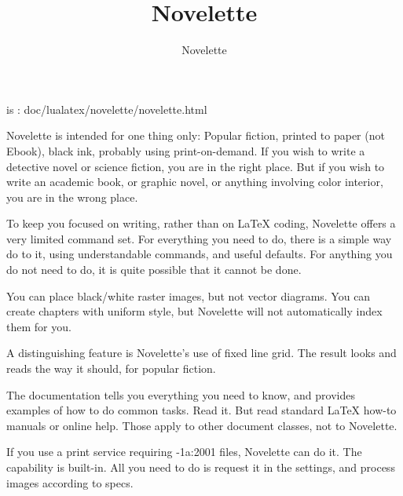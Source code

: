 \documentclass{novelette}
\title{Novelette}
\author{Novelette}
\begin{document}
\mainmatter
\begin{opening}
\null\null
{}
\null\null
\end{opening}
 is :
doc/lualatex/novelette/novelette.html\par
\scene{-}
Novelette is intended for one thing only: Popular fiction, printed to paper
(not Ebook), black ink, probably using print-on-demand. If you wish to write
a detective novel or science fiction, you are in the right place. But if
you wish to write an academic book, or graphic novel, or anything involving
color interior, you are in the wrong place.

To keep you focused on writing, rather than on LaTeX coding, Novelette offers
a very limited command set. For everything you need to do, there is a simple
way do to it, using understandable commands, and useful defaults. For anything
you do not need to do, it is quite possible that it cannot be done.

You can place black/white raster images, but not vector diagrams. You can
create chapters with uniform style, but Novelette will not automatically
index them for you.

A distinguishing feature is Novelette's use of fixed line grid. The result
looks and reads the way it should, for popular fiction.

The  documentation tells you everything you need to know,
and provides examples of how to do common tasks. Read it. But 
read standard LaTeX how-to manuals or online help. Those apply to other
document classes, not to Novelette.

If you use a print service requiring -1a:2001 files, Novelette
can do it. The capability is built-in. All you need to do is request it in the
settings, and process images according to specs.
\end{document}
